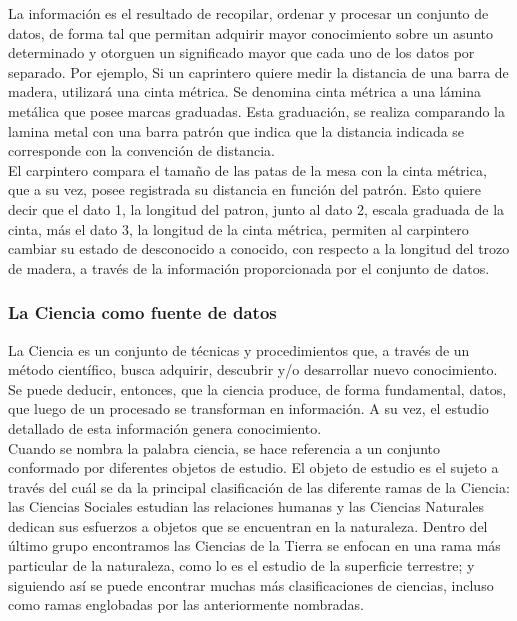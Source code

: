La información es el resultado de recopilar, ordenar y procesar un conjunto de datos, de forma tal que permitan adquirir mayor conocimiento sobre un asunto determinado y otorguen un significado mayor que cada uno de los datos por separado. Por ejemplo, Si un caprintero quiere medir la distancia de una barra de madera, utilizará una cinta métrica. Se denomina cinta métrica a una lámina metálica que posee marcas graduadas. Esta graduación, se realiza comparando la lamina metal con una barra patrón que indica que la distancia indicada se corresponde con la convención de distancia.\\

El carpintero compara el tamaño de las patas de la mesa con la cinta métrica, que a su vez, posee registrada su distancia en función del patrón. Esto quiere decir que el dato 1, la longitud del patron, junto al dato 2, escala graduada de la cinta, más el dato 3, la longitud de la cinta métrica, permiten al carpintero cambiar su estado de desconocido a conocido, con respecto a la longitud del trozo de madera, a través de la información proporcionada por el conjunto de datos.\\


\subsubsection*{La Ciencia como fuente de datos}
La Ciencia es un conjunto de técnicas y procedimientos que, a través de un método científico, busca adquirir, descubrir y/o desarrollar nuevo conocimiento. Se puede deducir, entonces, que la ciencia produce, de forma fundamental, datos, que luego de un procesado se transforman en información. A su vez, el estudio detallado de esta información genera conocimiento.\\

Cuando se nombra la palabra ciencia, se hace referencia a un conjunto conformado por diferentes objetos de estudio. El objeto de estudio es el sujeto a través del cuál se da la principal clasificación de las diferente ramas de la Ciencia: las Ciencias Sociales estudian las relaciones humanas y las Ciencias Naturales dedican sus esfuerzos a objetos que se encuentran en la naturaleza. Dentro del último grupo encontramos las Ciencias de la Tierra se enfocan en una rama más particular de la naturaleza, como lo es el estudio de la superficie terrestre; y siguiendo así se puede encontrar muchas más clasificaciones de ciencias, incluso como ramas englobadas por las anteriormente nombradas.\\

